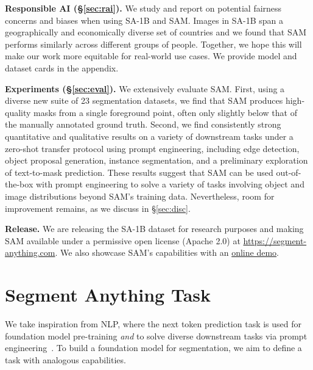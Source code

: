 \textbf{Responsible AI (\S\ref{sec:rai}).} We study and report on potential fairness concerns and biases when using \mbox{SA-1B} and SAM. Images in \mbox{SA-1B} span a geographically and economically diverse set of countries and we found that SAM performs similarly across different groups of people. Together, we hope this will make our work more equitable for real-world use cases. We provide model and dataset cards in the appendix.

\textbf{Experiments (\S\ref{sec:eval}).} We extensively evaluate SAM. First, using a diverse new suite of 23 segmentation datasets, we find that SAM produces high-quality masks from a single foreground point, often only slightly below that of the manually annotated ground truth. Second, we find consistently strong quantitative and qualitative results on a variety of downstream tasks under a zero-shot transfer protocol using prompt engineering, including edge detection, object proposal generation, instance segmentation, and a preliminary exploration of text-to-mask prediction. These results suggest that SAM can be used out-of-the-box with prompt engineering to solve a variety of tasks involving object and image distributions beyond SAM's training data. Nevertheless, room for improvement remains, as we discuss in \S\ref{sec:disc}.

\textbf{Release.} We are releasing the \mbox{SA-1B} dataset for research purposes and making SAM available under a permissive open license (Apache 2.0) at \href{https://segment-anything.com}{https://segment-anything.com}. We also showcase SAM's capabilities with an \href{https://segment-anything.com/demo}{online demo}.

\newcommand{\incvisualsrow}[6]{

\begin{subfigure}{\linewidth}\begin{adjustbox}{width=\textwidth}{
\def0.2{0.2}\setlength\tabcolsep{#1pt}}\end{adjustbox}\end{subfigure}

}

\section{Segment Anything Task}\label{sec:task}

We take inspiration from NLP, where the next token prediction task is used for foundation model pre-training \emph{and} to solve diverse downstream tasks via prompt engineering~\cite{Brown2020}. To build a foundation model for segmentation, we aim to define a task with analogous capabilities.

